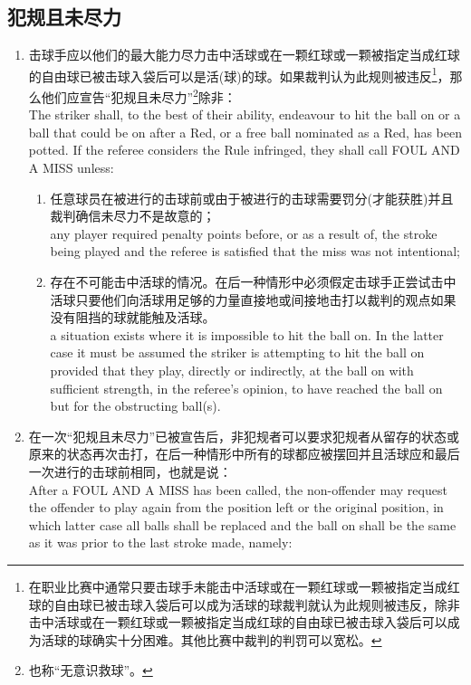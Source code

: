 \subsection{犯规且未尽力}\label{22314}

\begin{enumerate}[label=(\alph*)]
    \item \label{22314a}击球手应以他们的最大能力尽力击中活球或在一颗红球或一颗被指定当成红球的自由球已被击球入袋后可以是活(球)的球。如果裁判认为此规则被违反\footnote{在职业比赛中通常只要击球手未能击中活球或在一颗红球或一颗被指定当成红球的自由球已被击球入袋后可以成为活球的球裁判就认为此规则被违反，除非击中活球或在一颗红球或一颗被指定当成红球的自由球已被击球入袋后可以成为活球的球确实十分困难。其他比赛中裁判的判罚可以宽松。}，那么他们应宣告``犯规且未尽力''\footnote{也称``无意识救球''。}除非：\\
    The striker shall, to the best of their ability, endeavour to hit the ball on or a ball that could be on after a Red, or a free ball nominated as a Red, has been potted. If the referee considers the Rule infringed, they shall call FOUL AND A MISS unless:
    \begin{enumerate}[label=(\roman*)]
        \item \label{22314ai}任意球员在被进行的击球前或由于被进行的击球需要罚分(才能获胜)并且裁判确信未尽力不是故意的；\\
        any player required penalty points before, or as a result of, the stroke being played and the referee is satisfied that the miss was not intentional;
        \item 存在不可能击中活球的情况。在后一种情形中必须假定击球手正尝试击中活球只要他们向活球用足够的力量直接地或间接地击打以裁判的观点如果没有阻挡的球就能触及活球。\\
        a situation exists where it is impossible to hit the ball on. In the latter case it must be assumed the striker is attempting to hit the ball on provided that they play, directly or indirectly, at the ball on with sufficient strength, in the referee's opinion, to have reached the ball on but for the obstructing ball(s). 
    \end{enumerate}
    \item \label{22314b}在一次``犯规且未尽力''已被宣告后，非犯规者可以要求犯规者从留存的状态或原来的状态再次击打，在后一种情形中所有的球都应被摆回并且活球应和最后一次进行的击球前相同，也就是说：\\
    After a FOUL AND A MISS has been called, the non-offender may request the offender to play again from the position left or the original position, in which latter case all balls shall be replaced and the ball on shall be the same as it was prior to the last stroke made, namely: 

\end{enumerate}
